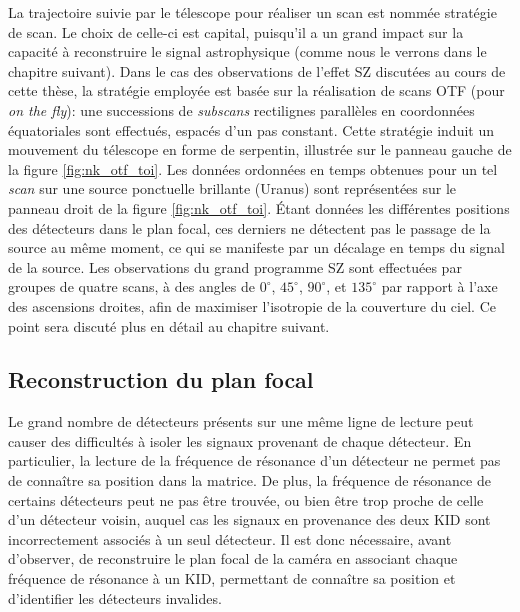 La trajectoire suivie par le télescope pour réaliser un scan est nommée stratégie de scan.
Le choix de celle-ci est capital, puisqu'il a un grand impact sur la capacité à reconstruire le signal astrophysique (comme nous le verrons dans le chapitre suivant).
Dans le cas des observations de l'effet SZ discutées au cours de cette thèse, la stratégie employée est basée sur la réalisation de scans OTF (pour \textit{on the fly}): une successions de \textit{subscans} rectilignes parallèles en coordonnées équatoriales sont effectués, espacés d'un pas constant.
Cette stratégie induit un mouvement du télescope en forme de serpentin, illustrée sur le panneau gauche de la figure \ref{fig:nk_otf_toi}.
Les données ordonnées en temps obtenues pour un tel \textit{scan} sur une source ponctuelle brillante (Uranus) sont représentées sur le panneau droit de la figure \ref{fig:nk_otf_toi}.
Étant données les différentes positions des détecteurs dans le plan focal, ces derniers ne détectent pas le passage de la source au même moment, ce qui se manifeste par un décalage en temps du signal de la source.
Les observations du grand programme SZ sont effectuées par groupes de quatre scans, à des angles de $0^\circ$, $45^\circ$, $90^\circ$, et $135^\circ$ par rapport à l'axe des ascensions droites, afin de maximiser l'isotropie de la couverture du ciel.
Ce point sera discuté plus en détail au chapitre suivant.

\subsection{Reconstruction du plan focal}\label{sec:focal_plane_reconstruction}

Le grand nombre de détecteurs présents sur une même ligne de lecture peut causer des difficultés à isoler les signaux provenant de chaque détecteur.
En particulier, la lecture de la fréquence de résonance d'un détecteur ne permet pas de connaître sa position dans la matrice.
De plus, la fréquence de résonance de certains détecteurs peut ne pas être trouvée, ou bien être trop proche de celle d'un détecteur voisin, auquel cas les signaux en provenance des deux KID sont incorrectement associés à un seul détecteur.
Il est donc nécessaire, avant d'observer, de reconstruire le plan focal de la caméra en associant chaque fréquence de résonance à un KID, permettant de connaître sa position et d'identifier les détecteurs invalides.

